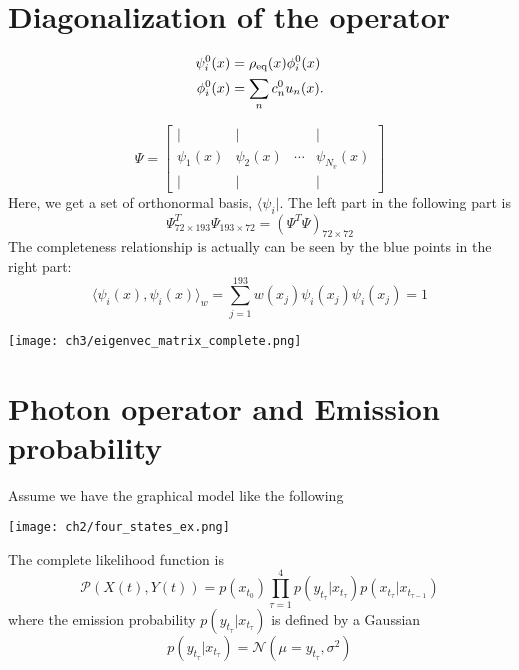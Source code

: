 \section{Diagonalization of the operator}
\begin{definition}
\begin{align}
        \psi^0_i(x) &= \rho_{\rm eq}(x) \phi^0_i(x) \\
        \phi^0_i(x) &= \sum_n c^0_n u_n(x).
\end{align}
\label{basisfunctions}
\end{definition}

\begin{definition}
\begin{equation}
\Psi=
\begin{bmatrix}
\vert & \vert &  & \vert \\
\psi_1(x) & \psi_2(x) & \cdots & \psi_{N_v}(x) \\
\vert & \vert &  & \vert 
\end{bmatrix}
\end{equation}
\label{eigenvectormatrix}
Here, we get a set of orthonormal basis, $\langle \psi_i |$. The left part in the following part is 
\begin{equation}
        \Psi^T_{72\times 193}\Psi_{193 \times 72} = (\Psi^T\Psi)_{72 \times 72}
\end{equation}
The completeness relationship is actually can be seen by the blue points in the right part:
\begin{equation}
        \langle \psi_i(x),\psi_i(x)\rangle _{w} = \sum_{j=1}^{193}w(x_j)\psi_i(x_j)\psi_i(x_j)  = 1
\end{equation}
\begin{center}
        \texttt{[image: ch3/eigenvec\_matrix\_complete.png]}   
\end{center}
\end{definition}

\section{Photon operator and Emission probability}
Assume we have the graphical model like the following						
\begin{center}
        \texttt{[image: ch2/four\_states\_ex.png]}   
\end{center}
The complete likelihood function is
\begin{equation}
\mathcal{P}(X(t), Y(t)) = p(x_{t_0}) \prod_{\tau=1}^4 p(y_{t_{\tau}}|x_{t_{\tau}}) p(x_{t_{\tau}}|x_{t_{\tau -1}})            
\end{equation}
where the emission probability $p(y_{t_{\tau}}|x_{t_{\tau}})$ is defined by a Gaussian
\begin{equation}
        p(y_{t_{\tau}}|x_{t_{\tau}}) =  \mathcal{N}(\mu = y_{t_{\tau}}  ,\sigma ^{2})       
\end{equation}

